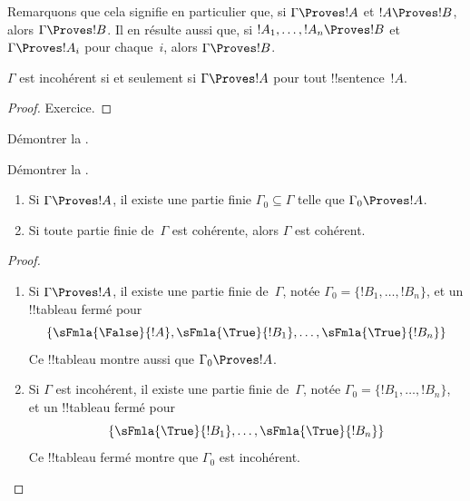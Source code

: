 \documentclass[../../../include/open-logic-section]{subfiles}
\begin{document}
Remarquons que cela signifie en particulier que, si
$\Gamma \Proves !A$ et $!A \Proves !B$, alors $\Gamma \Proves !B$.
Il en résulte aussi que, si $!A_1, \dots, !A_n \Proves !B$ et
$\Gamma \Proves !A_i$ pour chaque~$i$, alors $\Gamma \Proves !B$.

\begin{prop}
$\Gamma$ est incohérent si et seulement si $\Gamma \Proves !A$
pour tout !!{sentence}~$!A$.
\end{prop}

\begin{proof}
Exercice.
\end{proof}

\begin{prob}
Démontrer la .
\end{prob}
\tagendprob

\begin{prob}
Démontrer la .
\end{prob}
\tagendprob

\begin{prop}[Compacité]
  \begin{enumerate}
  \item Si $\Gamma \Proves !A$, il existe une partie finie $\Gamma_0
    \subseteq \Gamma$ telle que $\Gamma_0 \Proves !A$.
  \item Si toute partie finie de~$\Gamma$ est cohérente,
    alors $\Gamma$ est cohérent.
  \end{enumerate}
\end{prop}

\begin{proof}
  \begin{enumerate}
    \item Si $\Gamma \Proves !A$, il existe une partie finie
      de~$\Gamma$, notée
      $\Gamma_0 = \{!B_1, \dots, !B_n\}$, et un !!{tableau} fermé pour
      \[
      \{\sFmla{\False}{!A}, \sFmla{\True}{!B_1}, \dots, \sFmla{\True}{!B_n}\}
      \]
      Ce !!{tableau} montre aussi que $\Gamma_0 \Proves !A$.
    \item Si $\Gamma$ est incohérent, il existe une partie finie
      de~$\Gamma$, notée
      $\Gamma_0 = \{!B_1, \dots, !B_n\}$, et un !!{tableau} fermé pour
      \[
      \{\sFmla{\True}{!B_1}, \dots, \sFmla{\True}{!B_n}\}
      \]
      Ce !!{tableau} fermé montre que $\Gamma_0$ est incohérent.
  \end{enumerate}
\end{proof}
\end{document}
